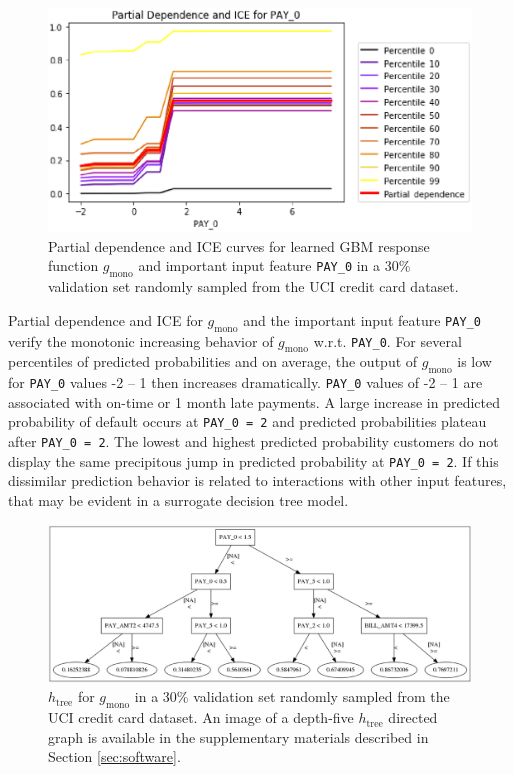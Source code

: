 \documentclass[sigconf, review]{acmart}
\begin{document}
\begin{figure}[htb]
	\begin{center}
		\includegraphics[scale=0.45]{img/figure_8.eps}
		\caption{Partial dependence and ICE curves for learned GBM response function $g_{\text{mono}}$ and important input feature \texttt{PAY\_0} in a 30\% validation set randomly sampled from the UCI credit card dataset.}
		\label{fig:cc_pdp_ice}
	\end{center}
\end{figure}

Partial dependence and ICE for $g_{\text{mono}}$ and the important input feature \texttt{PAY\_0} verify the monotonic increasing behavior of $g_{\text{mono}}$ w.r.t. \texttt{PAY\_0}. For several percentiles of predicted probabilities and on average, the output of $g_{\text{mono}}$ is low for \texttt{PAY\_0} values -2 -- 1 then increases dramatically. \texttt{PAY\_0} values of -2 -- 1 are associated with on-time or 1 month late payments. A large increase in predicted probability of default occurs at \texttt{PAY\_0 = 2} and predicted probabilities plateau after \texttt{PAY\_0 = 2}. The lowest and highest predicted probability customers do not display the same precipitous jump in predicted probability at \texttt{PAY\_0 = 2}. If this dissimilar prediction behavior is related to interactions with other input features, that may be evident in a surrogate decision tree model.

\begin{figure}[htb]
	\begin{center}
		\includegraphics[scale=0.18]{img/figure_9.eps}
		\caption{$h_{\text{tree}}$ for $g_{\text{mono}}$ in a 30\% validation set randomly sampled from the UCI credit card dataset. An image of a depth-five $h_{\text{tree}}$ directed graph is available in the supplementary materials described in Section \ref{sec:software}.}
		\label{fig:cc_dt_surrogate}
	\end{center}
\end{figure}
\end{document}

